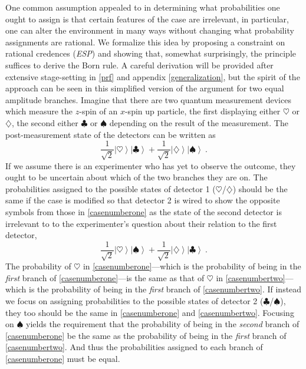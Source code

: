 \documentclass[onecolumn,secnumarabic,amsmath,amssymb,balancelastpage,nofootinbib]{article}
\newcommand{\ket}[1]{\ensuremath{\left|#1\right\rangle}}
\begin{document}
One common assumption appealed to in determining what probabilities one ought to assign is that certain features of the case are irrelevant, in particular, one can alter the environment in many ways without changing what probability assignments are rational.  We formalize this idea by proposing a constraint on rational credences (\emph{ESP}) and showing that, somewhat surprisingly, the principle suffices to derive the Born rule.  A careful derivation will be provided after extensive stage-setting in \textsection \ref{prf} and appendix \ref{generalization}, but the spirit of the approach can be seen in this simplified version of the argument for two equal amplitude branches.  Imagine that there are two quantum measurement devices which measure the $z$-spin of an $x$-spin up particle, the first displaying either $\heartsuit$ or $\diamondsuit$, the second either $\clubsuit$ or $\spadesuit$ depending on the result of the measurement.  The post-measurement state of the detectors can be written as
\begin{equation}
\frac{1}{\sqrt{2}}\ket{\heartsuit}\ket{\clubsuit}+\frac{1}{\sqrt{2}}\ket{\diamondsuit}\ket{\spadesuit}\ .
\label{casenumberone}
\end{equation}
If we assume there is an experimenter who has yet to observe the outcome, they ought to be uncertain about which of the two branches they are on.  The probabilities assigned to the possible states of detector 1 ($\heartsuit$/$\diamondsuit$) should be the same if the case is modified so that detector 2 is wired to show the opposite symbols from those in \eqref{casenumberone} as the state of the second detector is irrelevant to to the experimenter's question about their relation to the first detector,
\begin{equation}
\frac{1}{\sqrt{2}}\ket{\heartsuit}\ket{\spadesuit}+\frac{1}{\sqrt{2}}\ket{\diamondsuit}\ket{\clubsuit}\ .
\label{casenumbertwo}
\end{equation}
The probability of $\heartsuit$ in \eqref{casenumberone}---which is the probability of being in the \emph{first} branch of \eqref{casenumberone}---is the same as that of $\heartsuit$ in \eqref{casenumbertwo}---which is the probability of being in the \emph{first} branch of \eqref{casenumbertwo}.  If instead we focus on assigning probabilities to the possible states of detector 2 ($\clubsuit$/$\spadesuit$), they too should be the same in \eqref{casenumberone} and \eqref{casenumbertwo}.  Focusing on $\spadesuit$ yields the requirement that the probability of being in the \emph{second} branch of \eqref{casenumberone} be the same as the probability of being in the \emph{first} branch of \eqref{casenumbertwo}.  And thus the probabilities assigned to each branch of \eqref{casenumberone} must be equal.
\end{document}
